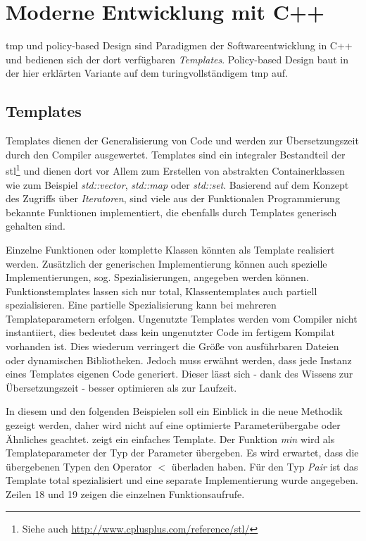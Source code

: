 \section{Moderne Entwicklung mit C++}
\label{chap:impl_tmp}
\acf{tmp} und policy-based Design \cite{Alexandrescu2001Modern} sind Paradigmen der Softwareentwicklung in C++ und bedienen sich der dort verfügbaren \emph{Templates}. Policy-based Design baut in der hier erklärten Variante auf dem turingvollständigem \ac{tmp} auf.

\subsection{Templates}
Templates dienen der Generalisierung von Code und werden zur Übersetzungszeit durch den Compiler ausgewertet. Templates sind ein integraler Bestandteil der \ac{stl}\footnote{Siehe auch \url{http://www.cplusplus.com/reference/stl/}} und dienen dort vor Allem zum Erstellen von abstrakten Containerklassen wie zum Beispiel \emph{std::vector}, \emph{std::map} oder \emph{std::set}. Basierend auf dem Konzept des Zugriffs über \emph{Iteratoren}, sind viele aus der Funktionalen Programmierung bekannte Funktionen implementiert, die ebenfalls durch Templates generisch gehalten sind.

Einzelne Funktionen oder komplette Klassen könnten als Template realisiert werden. Zusätzlich der generischen Implementierung können auch spezielle Implementierungen, sog. Spezialisierungen, angegeben werden können. Funktionstemplates lassen sich nur total, Klassentemplates auch partiell spezialisieren. Eine partielle Spezialisierung kann bei mehreren Templateparametern erfolgen. Ungenutzte Templates werden vom Compiler nicht instantiiert, dies bedeutet dass kein ungenutzter Code im fertigem Kompilat vorhanden ist. Dies wiederum verringert die Größe von ausführbaren Dateien oder dynamischen Bibliotheken. Jedoch muss erwähnt werden, dass jede Instanz eines Templates eigenen Code generiert. Dieser lässt sich - dank des Wissens zur Übersetzungszeit - besser optimieren als zur Laufzeit.

In diesem und den folgenden Beispielen soll ein Einblick in die neue Methodik gezeigt werden, daher wird nicht auf eine optimierte Parameterübergabe oder Ähnliches geachtet.  zeigt ein einfaches Template. Der Funktion \emph{min} wird als Templateparameter der Typ der Parameter übergeben. Es wird erwartet, dass die übergebenen Typen den Operator $<$ überladen haben. Für den Typ \emph{Pair} ist das Template total spezialisiert und eine separate Implementierung wurde angegeben. Zeilen 18 und 19 zeigen die einzelnen Funktionsaufrufe.


